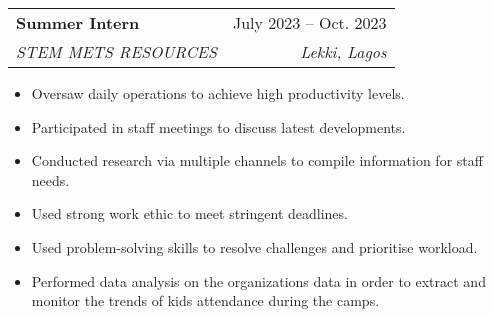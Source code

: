 \documentclass[letterpaper,11pt]{article}
\makeatletter
\newcommand{\resumeItem}[1]{
  \item\small{
    {#1 \vspace{-2pt}}
  }
}
\newcommand{\resumeSubheading}[4]{
  \vspace{-2pt}\item
    \begin{tabular*}{0.97\textwidth}[t]{l@{\extracolsep{\fill}}r}
      \textbf{#1} & #2 \\
      \textit{\small#3} & \textit{\small #4} \\
    \end{tabular*}\vspace{-7pt}
}
\newcommand{\resumeSubSubheading}[2]{
    \item
    \begin{tabular*}{0.97\textwidth}{l@{\extracolsep{\fill}}r}
      \textit{\small#1} & \textit{\small #2} \\
    \end{tabular*}\vspace{-7pt}
}
\newcommand{\resumeSubHeadingListEnd}{\end{itemize}}
\newcommand{\resumeItemListStart}{\begin{itemize}}
\newcommand{\resumeItemListEnd}{\end{itemize}\vspace{-5pt}}
\makeatother
\begin{document}
    \resumeSubheading
      {Summer Intern}{July 2023 -- Oct. 2023}
      {STEM METS RESOURCES}{Lekki, Lagos}
      \resumeItemListStart
        \resumeItem{Oversaw daily operations to achieve high productivity levels.}
        \resumeItem{Participated in staff meetings to discuss latest developments.}
        \resumeItem{Conducted research via multiple channels to compile information for staff needs.}
        \resumeItem{Used strong work ethic to meet stringent deadlines.}
        \resumeItem{Used problem-solving skills to resolve challenges and prioritise workload.}
        \resumeItem{Performed data analysis on the organizations data in order to extract and monitor the trends of kids attendance during the camps.}
      \resumeItemListEnd
      


\end{document}
